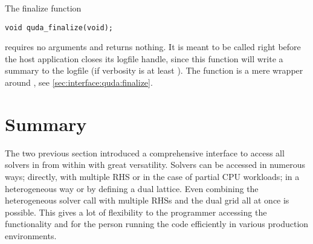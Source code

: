 
The finalize function
\begin{verbatim}
void quda_finalize(void);
\end{verbatim}
requires no arguments and returns nothing.
It is meant to be called right before the host application closes its logfile handle, since this function will write a summary to the logfile (if verbosity is at least ).
The function is a mere wrapper around , see \cref{sec:interface:quda:finalize}.

\section{Summary}
\label{sec:interface:summary}

The two previous section introduced a comprehensive interface to access all solvers in \quda from within \openqxd with great versatility.
Solvers can be accessed in numerous ways; directly, with multiple RHS or in the case of partial CPU workloads; in a heterogeneous way or by defining a dual lattice.
Even combining the heterogeneous solver call with multiple RHSs and the dual grid all at once is possible.
This gives a lot of flexibility to the programmer accessing the functionality and for the person running the code efficiently in various production environments.





